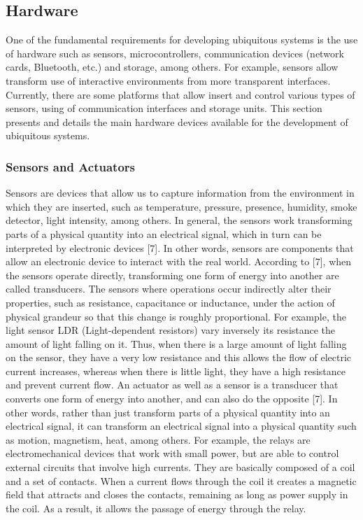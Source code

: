 \documentclass{acm_proc_article-sp}
\begin{document}
\subsection{Hardware}
One of the fundamental requirements for developing ubiquitous systems is the use of hardware such as sensors, microcontrollers, communication devices (network cards, Bluetooth, etc.) and storage, among others. For example, sensors allow transform use of interactive environments from more transparent interfaces. Currently, there are some platforms that allow insert and control various types of sensors, using of communication interfaces and storage units. This section presents and details the main hardware devices available for the development of ubiquitous systems.

\subsubsection{Sensors and Actuators}
Sensors are devices that allow us to capture information from the environment in which they are inserted, such as temperature, pressure, presence, humidity, smoke detector, light intensity, among others. In general, the sensors work transforming parts of a physical quantity into an electrical signal, which in turn can be interpreted by electronic devices [7]. In other words, sensors are components that allow an electronic device to interact with the real world.
\newline
\newline
According to [7], when the sensors operate directly, transforming one form of energy into another are called transducers. The sensors where operations occur indirectly alter their properties, such as resistance, capacitance or inductance, under the action of physical grandeur so that this change is roughly proportional. For example, the light sensor LDR (Light-dependent resistors) vary inversely its resistance the amount of light falling on it. Thus, when there is a large amount of light falling on the sensor, they have a very low resistance and this allows the flow of electric current increases, whereas when there is little light, they have a high resistance and prevent current flow.
\newline
\newline
An actuator as well as a sensor is a transducer that converts one form of energy into another, and can also do the opposite [7]. In other words, rather than just  transform parts of a physical quantity into an electrical signal, it can transform an electrical signal into a physical quantity such as motion, magnetism, heat, among others. For example, the relays are electromechanical devices that work with small power, but are able to control external circuits that involve high currents. They are basically composed of a coil and a set of contacts. When a current flows through the coil it creates a magnetic field that attracts and closes the contacts, remaining as long as power supply in the coil. As a result, it allows the passage of energy through the relay.
\end{document}
